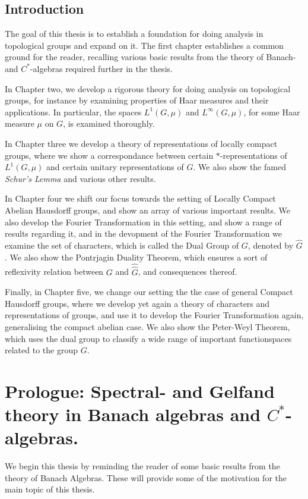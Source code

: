 \documentclass[10pt,twoside,openany,final]{memoir}
\theoremstyle{definition}
\theoremstyle{Break}
\newcommand{\G}{\widehat{G}}
\begin{document}

\newpage

\begin{KeepFromToc}
\chapter*{Introduction}
The goal of this thesis is to establish a foundation for doing analysis in topological groups and expand on it. The first chapter establishes a common ground for the reader, recalling various basic results from the theory of Banach- and $C^*$-algebras required further in the thesis.

In Chapter two, we develop a rigorous theory for doing analysis on topological groups, for instance by examining properties of Haar measures and their applications. In particular, the spaces $L^1(G,\mu)$ and $L^\infty(G,\mu)$, for some Haar measure $\mu$ on $G$, is examined thoroughly.

In Chapter three we develop a theory of representations of locally compact groups, where we show a correspondance between certain $*$-representations of $L^1(G,\mu)$ and certain unitary representations of $G$. We also show the famed \textit{Schur's Lemma} and various other results.

In Chapter four we shift our focus towards the setting of Locally Compact Abelian Hausdorff groups, and show an array of various important results. We also develop the Fourier Transformation in this setting, and show a range of results regarding it, and in the devopment of the Fourier Transformation we examine the set of characters, which is called the Dual Group of $G$, denoted by $\G$. We also show the Pontrjagin Duality Theorem, which ensures a sort of reflexivity relation between $G$ and $\widehat \G$, and consequences thereof.

Finally, in Chapter five, we change our setting the the case of general Compact Hausdorff groups, where we develop yet again a theory of characters and representations of groups, and use it to develop the Fourier Transformation again, generalising the compact abelian case. We also show the Peter-Weyl Theorem, which uses the dual group to classify a wide range of important functionspaces related to the group $G$.
\newpage
\setcounter{page}{2}
	  \tableofcontents
\end{KeepFromToc}


\chapter{Prologue: Spectral- and Gelfand theory in Banach algebras and $C^*$-algebras.}
We begin this thesis by reminding the reader of some basic results from the theory of Banach Algebras. These will provide some of the motivation for the main topic of this thesis.
\end{document}
